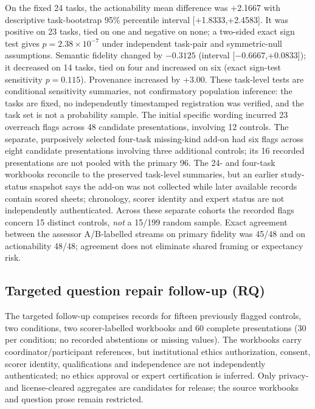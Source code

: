 \documentclass[12pt,a4paper]{article}
\begin{document}
On the fixed 24 tasks, the actionability mean difference was +2.1667 with descriptive task-bootstrap 95\% percentile interval [+1.8333,+2.4583]. It was positive on 23 tasks, tied on one and negative on none; a two-sided exact sign test gives $p=2.38\times10^{-7}$ under independent task-pair and symmetric-null assumptions. Semantic fidelity changed by $-0.3125$ (interval [$-0.6667$,+0.0833]); it decreased on 14 tasks, tied on four and increased on six (exact sign-test sensitivity $p=0.115$). Provenance increased by +3.00. These task-level tests are conditional sensitivity summaries, not confirmatory population inference: the tasks are fixed, no independently timestamped registration was verified, and the task set is not a probability sample. The initial specific wording incurred 23 overreach flags across 48 candidate presentations, involving 12 controls. The separate, purposively selected four-task missing-kind add-on had six flags across eight candidate presentations involving three additional controls; its 16 recorded presentations are not pooled with the primary 96. The 24- and four-task workbooks reconcile to the preserved task-level summaries, but an earlier study-status snapshot says the add-on was not collected while later available records contain scored sheets; chronology, scorer identity and expert status are not independently authenticated. Across these separate cohorts the recorded flags concern 15 distinct controls, \emph{not} a 15/199 random sample. Exact agreement between the assessor A/B-labelled streams on primary fidelity was 45/48 and on actionability 48/48; agreement does not eliminate shared framing or expectancy risk.

\subsection{Targeted question repair follow-up (RQ)}
The targeted follow-up comprises records for fifteen previously flagged controls, two conditions, two scorer-labelled workbooks and 60 complete presentations (30 per condition; no recorded abstentions or missing values). The workbooks carry coordinator/participant references, but institutional ethics authorization, consent, scorer identity, qualifications and independence are not independently authenticated; no ethics approval or expert certification is inferred. Only privacy- and license-cleared aggregates are candidates for release; the source workbooks and question prose remain restricted.
\end{document}
